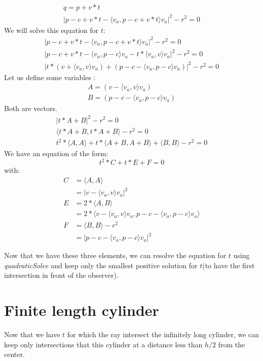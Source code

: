 \documentclass{article}
\begin{document}
\begin{gather*}
    q=p+v*t \\
    |p-c+v*t-\langle v_a, p-c+v*t\rangle v_a|^2-r^2=0
\end{gather*}
We will solve this equation for $t$:
\begin{gather*}
    |p-c+v*t-\langle v_a, p-c+v*t\rangle v_a|^2-r^2=0\\
    |p-c+v*t - \langle v_a, p-c\rangle v_a - t*\langle v_a, v\rangle v_a|^2 -r^2=0\\
    |t*(v+\langle v_a, v\rangle v_a) + (p-c- \langle v_a, p-c\rangle v_a)|^2 -r^2 = 0
\end{gather*}
Let us define some variables :
\begin{gather*}
    A = (v-\langle v_a, v\rangle v_a)\\
    B = (p-c- \langle v_a, p-c\rangle v_a)
\end{gather*}
Both are vectors.
\begin{gather*}
    |t*A + B|^2 -r^2 = 0\\
    \langle t*A+B, t*A+B\rangle  -r^2 = 0\\
    t^2 * \langle A,A\rangle  + t*\langle A+B, A+B\rangle  + \langle B,B\rangle  -r^2 = 0
\end{gather*}
We have an equation of the form:
$$t^2*C + t*E + F = 0$$
with:
\begin{align*}
    C &= \langle A,A\rangle  \\
    &= |v-\langle v_a, v\rangle v_a|^2\\
    E &= 2*\langle A, B\rangle  \\
    &= 2*\langle v-\langle v_a, v\rangle v_a, p-c- \langle v_a, p-c\rangle v_a\rangle \\
    F &= \langle B,B\rangle  -r^2 \\
    &= |p-c- \langle v_a, p-c\rangle v_a|^2
\end{align*}


Now that we have these three elements, we can resolve the equation for $t$ using \textit{quadraticSolve} and keep only the smallest positive solution for $t$(to have the first intersection in front of the observer).

\section{Finite length cylinder}
Now that we have $t$ for which the ray intersect the infinitely long cylinder, we can keep only intersections that this cylinder at a distance less than $h/2$ from the center.
\end{document}
